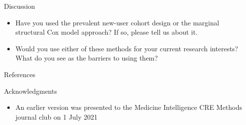 \documentclass[aspectratio=169,12pt]{beamer} %
\begin{document}
\begin{frame}{Discussion}
    \begin{itemize}
	\item Have you used the prevalent new-user cohort design or the marginal structural Cox model approach? If so, please tell us about it.
    	\item Would you use either of these methods for your current research interests? What do you see as the barriers to using them?
    \end{itemize}
\end{frame}

\begin{frame}{References}
        \tiny
        
\end{frame}

\begin{frame}{Acknowledgments}
    \begin{itemize}
	\item An earlier version was presented to the Medicine
	Intelligence CRE Methods journal club on 1 July 2021
    \end{itemize}
\end{frame}
\end{document}
